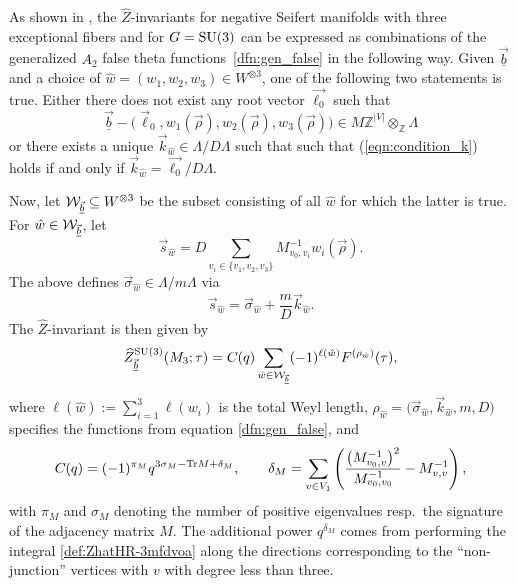 \documentclass[pdftex]{sigma}
\def\BZ{\mathbb{Z}}
\theoremstyle{definition}
\numberwithin{equation}{section}
\begin{document}
As shown in \cite{chengUpC}, the $\widehat Z$-invariants for negative Seifert manifolds with three exceptional fibers and for $G={\rm SU}(3)$ can be expressed as combinations of the generalized $A_2$ false theta functions~\eqref{dfn:gen_false} in the following way.
Given $\vec{\underline{b}}$ and a choice of $\hat w= (w_1,w_2,w_3)\in W^{\otimes 3}$, one of the following two statements is true. Either there does not exist any root vector $\vec{\ell_0}$ such that
\begin{equation}\label{eqn:condition_k}
 \vec{\underline{b}}- \bigl(\vec{\ell}_0,w_1(\vec{\rho}),w_2(\vec{\rho}),w_3(\vec{\rho})\bigr)\in M\BZ^{\left|V\right|}\otimes_{\BZ}\Lambda
\end{equation}
or there exists a unique $\vec k_{\hat w} \in \Lambda/D\Lambda$ such that such that (\ref{eqn:condition_k}) holds if and only if $\vec k_{\hat w}= \vec{\ell_0}/D\Lambda$.

Now, let ${\cal W}_{\vec{\underline{b}}} \subseteq W^{\otimes 3}$ be the subset consisting of all $\hat w$ for which the latter is true. For $\hat w\in {\cal W}_{\vec{\underline{b}}}$, let
\begin{equation*}%
\vec{s}_{\hat{w}} = D\sum\limits_{v_i \in \{v_1,v_2,v_3\}}
M^{-1}_{v_0,v_i}w_i(\vec{\rho}) .
\end{equation*}
The above defines $\vec{\sigma}_{\hat{w}}\in\Lambda/m\Lambda$ via
\[\vec{s}_{\hat{w}}= \vec{\sigma}_{\hat{w}}+\frac{m}{D} \vec{k}_{\hat{w}}. \]
The $\widehat Z$-invariant is then given by
\begin{equation}\label{s3:hombl-2}
\widehat{Z}^{{\rm SU}(3)}_{\vec{\underline{b}}}(M_3;\tau) =
C_{}(q)
\sum_{\hat{w}\in {\cal W}_{\vec{\underline{b}}} }
(-1)^{\ell (\hat{w})} F^{(\rho_{\hat w})} (\tau),
\end{equation}
where ${\ell (\hat{w})} := \sum_{i=1}^3 {\ell ({w_i})}$ is the total Weyl length, $\rho_{\hat w}=\bigl(\vec{\sigma}_{\hat{w}},\vec{k}_{\hat{w}},m,D\bigr)$ specifies the functions  from equation \eqref{dfn:gen_false}, and
\[ %
C_{}(q) = (-1)^{\pi_M} q^{3\sigma_M-{\rm Tr}M+\delta_M},\qquad
 \delta_{M}= \sum_{v\in V_{1}}\left( \frac{\left( M^{-1}_{v_{0},v} \right)^{2}}{M^{-1}_{v_0,v_0}}-M^{-1}_{v,v} \right),
\]
with $\pi_M$ and $\sigma_M$ denoting the number of positive eigenvalues resp.\ the signature of the adjacency matrix $M$. The additional power $q^{\delta_M}$ comes from performing the integral \eqref{def:ZhatHR-3mfdvoa} along the directions corresponding to the ``non-junction'' vertices with $v$ with degree less than three.
\end{document}
